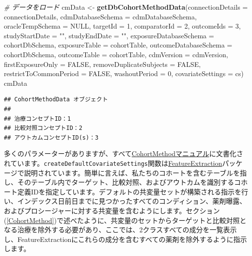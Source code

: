 \documentclass[
  11pt]{book}
\newenvironment{Shaded}{\begin{snugshade}}{\end{snugshade}}
\newcommand{\AttributeTok}[1]{\textcolor[rgb]{0.13,0.29,0.53}{#1}}
\newcommand{\CommentTok}[1]{\textcolor[rgb]{0.56,0.35,0.01}{\textit{#1}}}
\newcommand{\ConstantTok}[1]{\textcolor[rgb]{0.56,0.35,0.01}{#1}}
\newcommand{\DecValTok}[1]{\textcolor[rgb]{0.00,0.00,0.81}{#1}}
\newcommand{\FunctionTok}[1]{\textcolor[rgb]{0.13,0.29,0.53}{\textbf{#1}}}
\newcommand{\NormalTok}[1]{#1}
\newcommand{\OtherTok}[1]{\textcolor[rgb]{0.56,0.35,0.01}{#1}}
\newcommand{\StringTok}[1]{\textcolor[rgb]{0.31,0.60,0.02}{#1}}
\theoremstyle{definition}
\theoremstyle{definition}
\theoremstyle{definition}
\theoremstyle{definition}
\theoremstyle{remark}
\begin{document}
\begin{Shaded}
\begin{Highlighting}[]
\CommentTok{\# データをロード}
\NormalTok{cmData }\OtherTok{\textless{}{-}} \FunctionTok{getDbCohortMethodData}\NormalTok{(}\AttributeTok{connectionDetails =}\NormalTok{ connectionDetails,}
                                \AttributeTok{cdmDatabaseSchema =}\NormalTok{ cdmDatabaseSchema,}
                                \AttributeTok{oracleTempSchema =} \ConstantTok{NULL}\NormalTok{,}
                                \AttributeTok{targetId =} \DecValTok{1}\NormalTok{,}
                                \AttributeTok{comparatorId =} \DecValTok{2}\NormalTok{,}
                                \AttributeTok{outcomeIds =} \DecValTok{3}\NormalTok{,}
                                \AttributeTok{studyStartDate =} \StringTok{""}\NormalTok{,}
                                \AttributeTok{studyEndDate =} \StringTok{""}\NormalTok{,}
                                \AttributeTok{exposureDatabaseSchema =}\NormalTok{ cohortDbSchema,}
                                \AttributeTok{exposureTable =}\NormalTok{ cohortTable,}
                                \AttributeTok{outcomeDatabaseSchema =}\NormalTok{ cohortDbSchema,}
                                \AttributeTok{outcomeTable =}\NormalTok{ cohortTable,}
                                \AttributeTok{cdmVersion =}\NormalTok{ cdmVersion,}
                                \AttributeTok{firstExposureOnly =} \ConstantTok{FALSE}\NormalTok{,}
                                \AttributeTok{removeDuplicateSubjects =} \ConstantTok{FALSE}\NormalTok{,}
                                \AttributeTok{restrictToCommonPeriod =} \ConstantTok{FALSE}\NormalTok{,}
                                \AttributeTok{washoutPeriod =} \DecValTok{0}\NormalTok{,}
                                \AttributeTok{covariateSettings =}\NormalTok{ cs)}
\NormalTok{cmData}
\end{Highlighting}
\end{Shaded}

\begin{verbatim}
## CohortMethodData オブジェクト
## 
## 治療コンセプトID：1
## 比較対照コンセプトID：2
## アウトカムコンセプトID(s)：3
\end{verbatim}

多くのパラメーターがありますが、すべて\href{https://ohdsi.github.io/CohortMethod/reference/}{CohortMethodマニュアル}に文書化されています。\texttt{createDefaultCovariateSettings}関数は\href{https://ohdsi.github.io/FeatureExtraction/}{FeatureExtraction}パッケージで説明されています。簡単に言えば、私たちのコホートを含むテーブルを指し、そのテーブル内でターゲット、比較対照、およびアウトカムを識別するコホート定義IDを指定しています。デフォルトの共変量セットが構築される指示を行い、インデックス日前日までに見つかったすべてのコンディション、薬剤曝露、およびプロシージャーに対する共変量を含むようにします。セクション (\ref{CohortMethod})で述べたように、共変量のセットからターゲットと比較対照となる治療を除外する必要があり、ここでは、2クラスすべての成分を一覧表示し、FeatureExtractionにこれらの成分を含むすべての薬剤を除外するように指示します。
\end{document}
